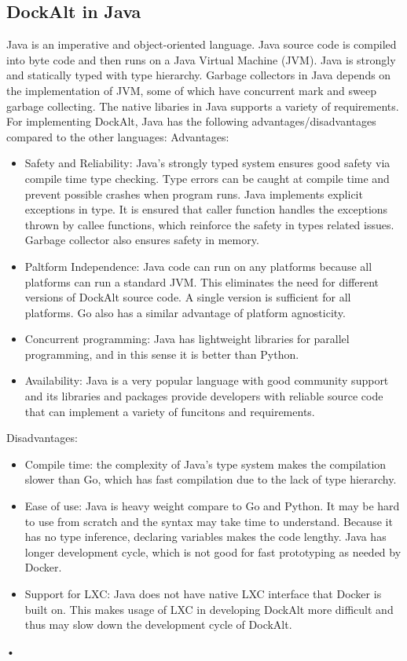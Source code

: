 \documentclass[letterpaper,twocolumn,10pt]{article}
\begin{document}
\subsection{DockAlt in Java}
Java is an imperative and object-oriented language. Java source code is compiled into byte code and then runs on a Java Virtual Machine (JVM). Java is strongly and statically typed with type hierarchy. Garbage collectors in Java depends on the implementation of JVM, some of which have concurrent mark and sweep garbage collecting. The native libaries in Java supports a variety of requirements. For implementing DockAlt, Java has the following advantages/disadvantages compared to the other languages:\newline
Advantages:
\begin{itemize}
\item Safety and Reliability: Java's strongly typed system ensures good safety via compile time type checking. Type errors can be caught at compile time and prevent possible crashes when program runs. Java implements explicit exceptions in type. It is ensured that caller function handles the exceptions thrown by callee functions, which reinforce the safety in types related issues. Garbage collector also ensures safety in memory. 
\item Paltform Independence: Java code can run on any platforms because all platforms can run a standard JVM. This eliminates the need for different versions of DockAlt source code. A single version is sufficient for all platforms. Go also has a similar advantage of platform agnosticity.
\item Concurrent programming: Java has lightweight libraries for parallel programming, and in this sense it is better than Python.
\item Availability: Java is a very popular language with good community support and its libraries and packages provide developers with reliable source code that can implement a variety of funcitons and requirements.
\end{itemize}
Disadvantages:
\begin{itemize} 
\item Compile time: the complexity of Java's type system makes the compilation slower than Go, which has fast compilation due to the lack of type hierarchy.
\item Ease of use: Java is heavy weight compare to Go and Python. It may be hard to use from scratch and the syntax may take time to understand. Because it has no type inference, declaring variables makes the code lengthy. Java has longer development cycle, which is not good for fast prototyping as needed by Docker. 
\item Support for LXC: Java does not have native LXC interface that Docker is built on. This makes usage of LXC in developing DockAlt more difficult and thus may slow down the development cycle of DockAlt.
\end{itemize}•
\end{document}
